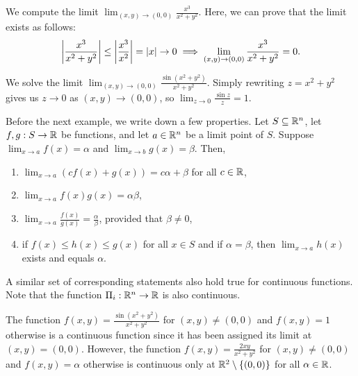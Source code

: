 \begin{example}
    We compute the limit $\lim_{(x,y) \to (0,0)} \frac{x^{3}}{x^{2}+y^{2}}$. Here, we can prove that the limit exists as follows:
    \begin{align}
        \left| \frac{x^{3}}{x^{2}+y^{2}} \right| \leq \left| \frac{x^{3}}{x^{2}} \right| = \left| x \right| \to 0 \implies \lim_{(x,y)\to(0,0)} \frac{x^{3}}{x^{2}+y^{2}} = 0.
    \end{align}
\end{example}

\begin{example}
    We solve the limit $\lim_{(x,y) \to (0,0)} \frac{\sin(x^{2}+y^{2})}{x^{2}+y^{2}}$. Simply rewriting $z = x^{2}+y^{2}$ gives us $z \to 0$ as $(x,y) \to (0,0)$, so $\lim_{z \to 0} \frac{\sin z}{z} = 1$.
\end{example}

Before the next example, we write down a few properties. Let $S \subseteq \mathbb{R}^{n}$, let $f,g:S \to \mathbb{R}$ be functions, and let $a \in \mathbb{R}^{n}$ be a limit point of $S$. Suppose $\lim_{x \to a} f(x) = \alpha$ and $\lim_{x \to b} g(x) = \beta$. Then,
\begin{enumerate}
    \item $\lim_{x \to a} (cf(x)+g(x)) = c \alpha + \beta$ for all $c \in \mathbb{R}$,
    \item $\lim_{x \to a}f(x)g(x) = \alpha\beta$,
    \item $\lim_{x \to a} \frac{f(x)}{g(x)} = \frac{\alpha}{\beta}$, provided that $\beta \neq 0$,
    \item if $f(x) \leq h(x) \leq g(x)$ for all $x \in S$ and if $\alpha = \beta$, then $\lim_{x \to a} h(x)$ exists and equals $\alpha$.
\end{enumerate}

A similar set of corresponding statements also hold true for continuous functions. Note that the function $\Pi_{i}:\mathbb{R}^{n} \to \mathbb{R}$ is also continuous.

\begin{example}
    The function $f(x,y) = \frac{\sin(x^{2}+y^{2})}{x^{2}+y^{2}}$ for $(x,y) \neq (0,0)$ and $f(x,y) = 1$ otherwise is a continuous function since it has been assigned its limit at $(x,y) = (0,0)$. However, the function $f(x,y) = \frac{2xy}{x^{2}+y^{2}}$ for $(x,y) \neq (0,0)$ and $f(x,y) = \alpha$ otherwise is continuous only at $\mathbb{R}^{2}\setminus\{(0,0)\}$ for all $\alpha \in \mathbb{R}$.
\end{example}

